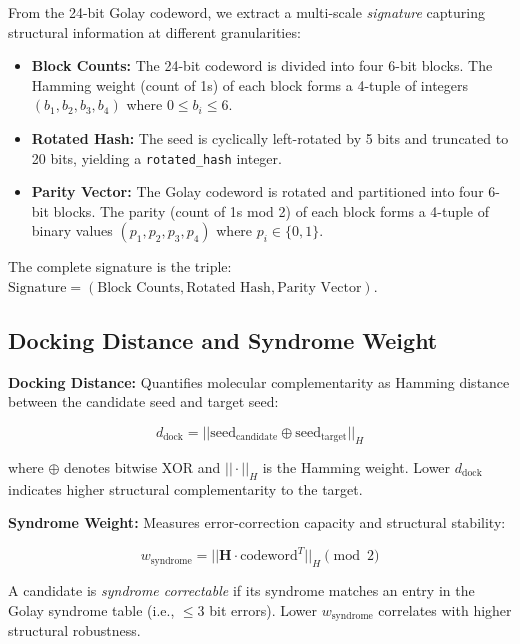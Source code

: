 \documentclass[12pt,a4paper]{article}
\begin{document}
From the 24-bit Golay codeword, we extract a multi-scale \textit{signature} capturing structural information at different granularities:

\begin{itemize}
\item \textbf{Block Counts:} The 24-bit codeword is divided into four 6-bit blocks. The Hamming weight (count of 1s) of each block forms a 4-tuple of integers $(b_1, b_2, b_3, b_4)$ where $0 \leq b_i \leq 6$.

\item \textbf{Rotated Hash:} The seed is cyclically left-rotated by 5 bits and truncated to 20 bits, yielding a \texttt{rotated\_hash} integer.

\item \textbf{Parity Vector:} The Golay codeword is rotated and partitioned into four 6-bit blocks. The parity (count of 1s mod 2) of each block forms a 4-tuple of binary values $(p_1, p_2, p_3, p_4)$ where $p_i \in \{0,1\}$.
\end{itemize}

The complete signature is the triple: $\text{Signature} = (\text{Block Counts}, \text{Rotated Hash}, \text{Parity Vector})$.

\subsection{Docking Distance and Syndrome Weight}

\textbf{Docking Distance:} Quantifies molecular complementarity as Hamming distance between the candidate seed and target seed:

\begin{equation}
d_{\text{dock}} = ||\text{seed}_{\text{candidate}} \oplus \text{seed}_{\text{target}}||_H
\end{equation}

where $\oplus$ denotes bitwise XOR and $||\cdot||_H$ is the Hamming weight. Lower $d_{\text{dock}}$ indicates higher structural complementarity to the target.

\textbf{Syndrome Weight:} Measures error-correction capacity and structural stability:

\begin{equation}
w_{\text{syndrome}} = ||\mathbf{H} \cdot \text{codeword}^T||_H \pmod{2}
\end{equation}

A candidate is \textit{syndrome correctable} if its syndrome matches an entry in the Golay syndrome table (i.e., $\leq3$ bit errors). Lower $w_{\text{syndrome}}$ correlates with higher structural robustness.
\end{document}
